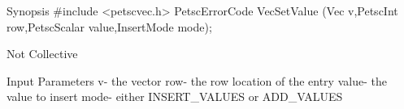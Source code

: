 Synopsis
#include <petscvec.h>
PetscErrorCode VecSetValue
   (Vec v,PetscInt row,PetscScalar value,InsertMode mode);

Not Collective

Input Parameters
v- the vector
row- the row location of the entry
value- the value to insert
mode- either INSERT_VALUES or ADD_VALUES
